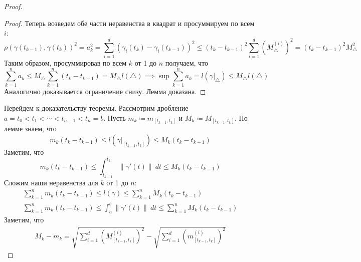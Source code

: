 \begin{proof}
\begin{proof}
      Теперь возведем обе части неравенства в квадрат и просуммируем по всем $i$:
      \begin{equation*}
        \rho(\gamma(t_{k - 1}), \gamma(t_k))^2 = a_k^2 =
        \sum\limits_{i = 1}^{d}(\gamma_i(t_k) - \gamma_i(t_{k - 1}))^2 \leq
        (t_k - t_{k - 1})^2 \sum\limits_{i = 1}^{d}\left(M_{\triangle}^{(i)}\right)^2 =
        (t_k - t_{k -1 })^2M_{\triangle}^2
      \end{equation*}
      Таким образом, просуммировав по всем $k$ от 1 до $n$ получаем, что
      \begin{equation*}
        \sum\limits_{k = 1}^{n} a_k \leq
        M_{\triangle} \sum\limits_{k = 1}^{n}(t_k - t_{k - 1}) = M_{\triangle}l(\triangle)
        \implies
        \sup \sum\limits_{k = 1}^{n} a_k =
        l(\gamma \big|_{\triangle}) \leq M_{\triangle}l(\triangle)
      \end{equation*}
      Аналогично доказывается ограничение снизу. Лемма доказана.
    \end{proof}
    Перейдем к доказательству теоремы. Рассмотрим дробление $a = t_0 < t_1 < \dotsb < t_{n - 1} < t_n = b$. Пусть $m_k \coloneqq m_{[t_{k - 1}, t_k]}$ и $M_k \coloneqq M_{[t_{k - 1}, t_k]}$. По лемме знаем, что
    \begin{equation*}
      m_k(t_k - t_{k - 1}) \leq l(\gamma\big|_{[t_{k - 1}, t_k]}) \leq M_k(t_k - t_{k - 1})
    \end{equation*}
    Заметим, что
    \begin{equation*}
      m_k(t_k - t_{k - 1}) \leq
      \int_{t_{k - 1}}^{t_k} \|\gamma'(t) \| \: dt
      \leq M_k(t_k - t_{k - 1})
    \end{equation*}
    Сложим наши неравенства для $k$ от 1 до $n$:
    \begin{equation*}
      \begin{gathered}
        \sum\limits_{k = 1}^{n} m_k(t_k - t_{k - 1})
        \leq l(\gamma) \leq \sum\limits_{k = 1}^{n} M_k(t_k - t_{k - 1}) \\
        \sum\limits_{k = 1}^{n} m_k(t_k - t_{k - 1})
        \leq \int_{a}^{b} \|\gamma'(t) \| \: dt \leq \sum\limits_{k = 1}^{n} M_k(t_k - t_{k - 1})
      \end{gathered}
    \end{equation*}
    Заметим, что
    \begin{equation*}
      \begin{gathered}
        M_k - m_k = \sqrt{\sum\limits_{i = 1}^{d}\left(M_{[t_{k - 1}, t_k]}^{(i)}\right)^2} -
        \sqrt{\sum\limits_{i = 1}^{d}\left(m_{[t_{k - 1}, t_k]}^{(i)}\right)^2}

\end{gathered}
\end{equation*}
\end{proof}
